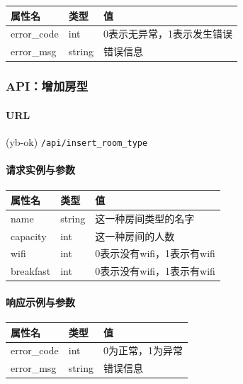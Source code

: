 \documentclass[]{article}
\let\oldparagraph\paragraph
\renewcommand{\paragraph}[1]{\oldparagraph{#1}\mbox{}}
\begin{document}
\begin{Shaded}
\begin{Highlighting}[]
\FunctionTok{\{}
    \FunctionTok{:}\FunctionTok{,}
    \FunctionTok{:}
\FunctionTok{\}}
\end{Highlighting}
\end{Shaded}

\begin{longtable}[]{@{}lll@{}}
\toprule
属性名 & 类型 & 值\tabularnewline
\midrule
\endhead
error\_code & int & 0表示无异常，1表示发生错误\tabularnewline
error\_msg & string & 错误信息\tabularnewline
\bottomrule
\end{longtable}

\hypertarget{apiux589eux52a0ux623fux578b}{%
\subsubsection{API：增加房型}\label{apiux589eux52a0ux623fux578b}}

\hypertarget{url-16}{%
\paragraph{URL}\label{url-16}}

(yb-ok) \texttt{/api/insert\_room\_type}

\hypertarget{ux8bf7ux6c42ux5b9eux4f8bux4e0eux53c2ux6570}{%
\paragraph{请求实例与参数}\label{ux8bf7ux6c42ux5b9eux4f8bux4e0eux53c2ux6570}}

\begin{longtable}[]{@{}lll@{}}
\toprule
属性名 & 类型 & 值\tabularnewline
\midrule
\endhead
name & string & 这一种房间类型的名字\tabularnewline
capacity & int & 这一种房间的人数\tabularnewline
wifi & int & 0表示没有wifi，1表示有wifi\tabularnewline
breakfast & int & 0表示没有wifi，1表示有wifi\tabularnewline
\bottomrule
\end{longtable}

\hypertarget{ux54cdux5e94ux793aux4f8bux4e0eux53c2ux6570-8}{%
\paragraph{响应示例与参数}\label{ux54cdux5e94ux793aux4f8bux4e0eux53c2ux6570-8}}

\begin{longtable}[]{@{}lll@{}}
\toprule
属性名 & 类型 & 值\tabularnewline
\midrule
\endhead
error\_code & int & 0为正常，1为异常\tabularnewline
error\_msg & string & 错误信息\tabularnewline
\bottomrule
\end{longtable}
\end{document}
